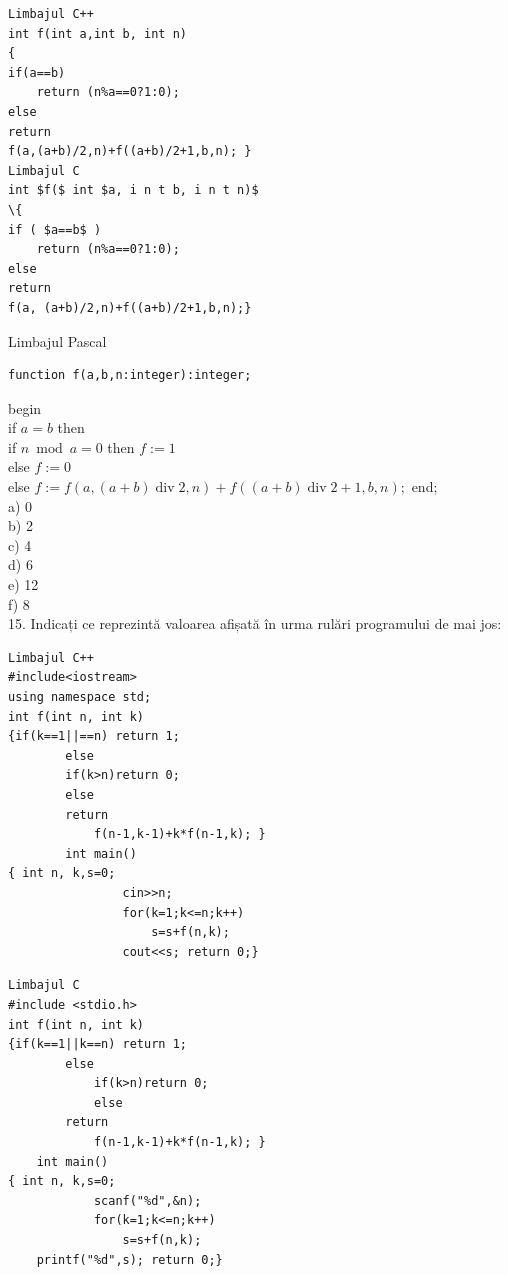 \documentclass[10pt]{article}
\begin{document}
\begin{verbatim}
Limbajul C++
int f(int a,int b, int n)
{
if(a==b)
    return (n%a==0?1:0);
else
return
f(a,(a+b)/2,n)+f((a+b)/2+1,b,n); }
Limbajul C
int $f($ int $a, i n t b, i n t n)$
\{
if ( $a==b$ )
    return (n%a==0?1:0);
else
return
f(a, (a+b)/2,n)+f((a+b)/2+1,b,n);}
\end{verbatim}

Limbajul Pascal

\begin{verbatim}
function f(a,b,n:integer):integer;
\end{verbatim}

begin\\
if $a=b$ then\\
if $n \bmod a=0$ then $f:=1$\\
else $f:=0$\\
else $f:=f(a,(a+b) \operatorname{div} 2, n)+f((a+b) \operatorname{div} 2+1, b, n) ;$ end;\\
a) 0\\
b) 2\\
c) 4\\
d) 6\\
e) 12\\
f) 8\\
15. Indicați ce reprezintă valoarea afișată în urma rulări programului de mai jos:

\begin{verbatim}
Limbajul C++
#include<iostream>
using namespace std;
int f(int n, int k)
{if(k==1||==n) return 1;
        else
        if(k>n)return 0;
        else
        return
            f(n-1,k-1)+k*f(n-1,k); }
        int main()
{ int n, k,s=0;
                cin>>n;
                for(k=1;k<=n;k++)
                    s=s+f(n,k);
                cout<<s; return 0;}
\end{verbatim}

\begin{verbatim}
Limbajul C
#include <stdio.h>
int f(int n, int k)
{if(k==1||k==n) return 1;
        else
            if(k>n)return 0;
            else
        return
            f(n-1,k-1)+k*f(n-1,k); }
    int main()
{ int n, k,s=0;
            scanf("%d",&n);
            for(k=1;k<=n;k++)
                s=s+f(n,k);
    printf("%d",s); return 0;}
\end{verbatim}
\end{document}

